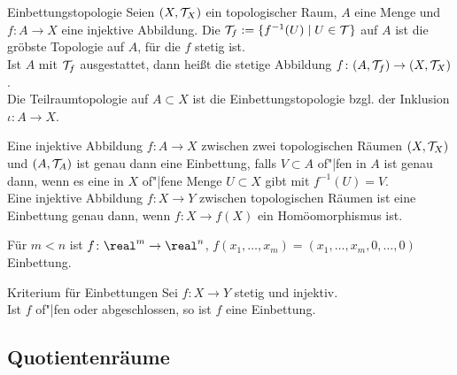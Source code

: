 \linie

\begin{Def}{Einbettungstopologie}
    Seien $(X, \mathcal{T}_X)$ ein topologischer Raum, $A$ eine Menge und \\
    $f\colon A \rightarrow X$ eine injektive Abbildung.
    Die  $\mathcal{T}_f := \{f^{-1}(U) \;|\; U \in \mathcal{T}\}$
    auf $A$ ist die gröbste Topologie auf $A$, für die $f$ stetig ist. \\
    Ist $A$ mit $\mathcal{T}_f$ ausgestattet, dann heißt die stetige Abbildung
    $f\colon (A, \mathcal{T}_f) \rightarrow (X, \mathcal{T}_X)$ . \\
    Die Teilraumtopologie auf $A \subset X$ ist die Einbettungstopologie
    bzgl. der Inklusion $\iota\colon A \rightarrow X$.
\end{Def}

\begin{Bem}
    Eine injektive Abbildung $f\colon A \rightarrow X$ zwischen zwei
    topologischen Räumen $(X, \mathcal{T}_X)$ und $(A, \mathcal{T}_A)$
    ist genau dann eine Einbettung, falls
    $V \subset A$ of"|fen in $A$ ist genau dann, wenn es eine in $X$ of"|fene
    Menge $U \subset X$ gibt mit $f^{-1}(U) = V$. \\
    Eine injektive Abbildung $f\colon X \rightarrow Y$ zwischen topologischen
    Räumen ist eine Einbettung genau dann, wenn
    $f\colon X \rightarrow f(X)$ ein Homöomorphismus ist.
\end{Bem}

\begin{Bsp}
    Für $m < n$ ist $f\colon \real^m \rightarrow \real^n$,
    $f(x_1, \dotsc, x_m) = (x_1, \dotsc, x_m, 0, \dotsc, 0)$
    Einbettung.
\end{Bsp}

\begin{Satz}{Kriterium für Einbettungen}
    Sei $f\colon X \rightarrow Y$ stetig und injektiv. \\
    Ist $f$ of"|fen oder abgeschlossen, so ist $f$ eine Einbettung.
\end{Satz}

\pagebreak

\subsection{%
    Quotientenräume%
}

